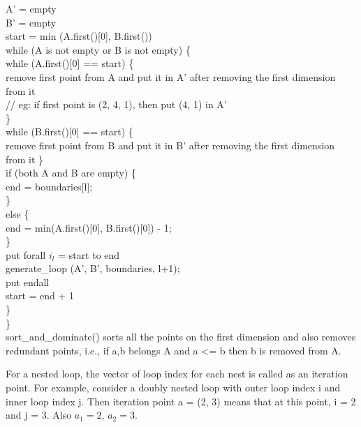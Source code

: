 \indent	A' = empty \\
\indent	B' = empty \\
\indent	start = min (A.first()[0], B.first()) \\
	
\indent	while (A is not empty or B is not empty) \{ \\
		
\indent\indent		while (A.first()[0] == start) \{ \\
\indent\indent\indent			remove first point from A and put it in A' after removing the first dimension from it \\
\indent\indent\indent			// eg: if first point is (2, 4, 1), then put (4, 1) in A' \\
\indent\indent		\} \\
\indent\indent		while (B.first()[0] == start) \{ \\
\indent\indent\indent			remove first point from B and put it in B' after removing the first dimension from it
\indent\indent		\} \\

\indent\indent		if (both A and B are empty) \{ \\
\indent\indent\indent			end = boundaries[l]; \\
\indent\indent		\} \\
\indent\indent		else \{ \\
\indent\indent\indent			end = min(A.first()[0], B.first()[0]) - 1; \\
\indent\indent		\} \\

\indent\indent		put forall $i_l$ = start to end \\
\indent\indent		generate\_loop (A', B', boundaries, l+1); \\
\indent\indent		put endall \\

\indent\indent		start = end + 1 \\
\indent	\} \\
\} \\	

sort\_and\_dominate() sorts all the points on the first dimension and also removes redundant points, i.e., if a,b belongs A and a <= b then b is removed from A.
	







For a nested loop, the vector of loop index for each nest is called as an iteration point. For example, consider a doubly nested loop with outer loop index i and inner loop index j. Then iteration point a = (2, 3) means that at this point, i = 2 and j = 3. Also $a_1 = 2$, $a_2 = 3.$ \\

